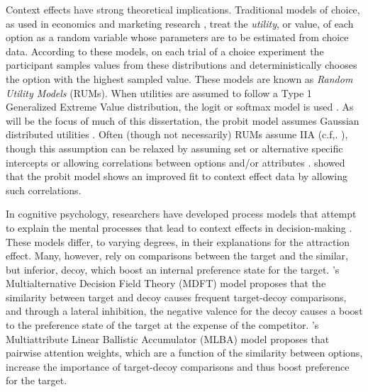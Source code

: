 Context effects have strong theoretical implications. Traditional models of choice, as used in economics and marketing research \parencite{mcfadden2001economic}, treat the \textit{utility}, or value, of each option as a random variable whose parameters are to be estimated from choice data. According to these models, on each trial of a choice experiment the participant samples values from these distributions and deterministically chooses the option with the highest sampled value. These models are known as \textit{Random Utility Models} (RUMs). When utilities are assumed to follow a Type 1 Generalized Extreme Value distribution, the logit or softmax model is used \parencite{gensch1979multinomial}. As will be the focus of much of this dissertation, the probit model assumes Gaussian distributed utilities \parencite{bolduc1999practical}. Often (though not necessarily) RUMs assume IIA (c.f,. \textcite{paetzUtilityIndependenceIIA2018}), though this assumption can be relaxed by assuming set or alternative specific intercepts \parencite{rooderkerk2011incorporating} or allowing correlations between options and/or attributes \parencite{haaijer1998utility}. \textcite{haaijer1998utility} showed that the probit model shows an improved fit to context effect data by allowing such correlations. 

In cognitive psychology, researchers have developed process models that attempt to explain the mental processes that lead to context effects in decision-making \parencite{trueblood2014multiattribute,roeMultialternativeDecisionField2001a,usherLossAversionInhibition2004a,bhatiaAssociationsAccumulationPreference2013b,noguchiMultialternativeDecisionSampling2018a,wollschlager2NaryChoiceTree2012a,bergnerVAMPVotingAgent2019b,tverskyEliminationAspectsTheory1972,tversky1993context}. These models differ, to varying degrees, in their explanations for the attraction effect. Many, however, rely on comparisons between the target and the similar, but inferior, decoy, which boost an internal  preference state for the target. \textcite{roeMultialternativeDecisionField2001a}'s Multialternative Decision Field Theory (MDFT) model proposes that the similarity between target and decoy causes frequent target-decoy comparisons, and through a lateral inhibition, the negative valence for the decoy causes a boost to the preference state of the target at the expense of the competitor. \textcite{trueblood2014multiattribute}'s Multiattribute Linear Ballistic Accumulator (MLBA) model proposes that pairwise attention weights, which are a function of the similarity between options, increase the importance of target-decoy comparisons and thus boost preference for the target. 

